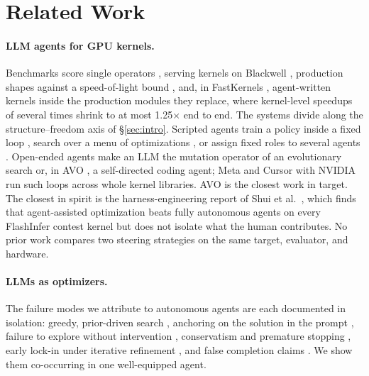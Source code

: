 \section{Related Work}
\label{sec:related}

\paragraph{LLM agents for GPU kernels.} Benchmarks score single operators
\cite{ouyang2025kernelbench,zhang2026kernelbenchverified}, serving kernels on Blackwell
\cite{xing2026flashinferbench,cao2026ksearch}, production shapes against a speed-of-light bound
\cite{lin2026solexecbench}, and, in FastKernels \cite{oliaro2026fastkernels}, agent-written kernels
inside the production modules they replace, where kernel-level speedups of several times shrink to
at most 1.25$\times$ end to end. The systems divide along the structure--freedom axis of
\S\ref{sec:intro}. Scripted agents train a policy inside a fixed loop
\cite{baronio2025kevin,li2025cudal1,drkernel2026,zhu2026qimengkernel,cudaagent2026}, search over a
menu of optimizations \cite{hong2025autocomp,kernelpro2026}, or assign fixed roles to several agents
\cite{wei2025astra,kernelskill2026,han2026kda,luo2026houmao,sun2026kernelclaw}. Open-ended agents
make an LLM the mutation operator of an evolutionary search
\cite{romeraparedes2024funsearch,novikov2025alphaevolve,lange2025shinkaevolve,guo2025evoengineer,wiedemann2026kernelfoundry,yuksekgonul2026tttdiscover,lange2025aicudaengineer,cuco2026}
or, in AVO \cite{chen2026avo}, a self-directed coding agent; Meta \cite{liao2025kernelevolve} and
Cursor with NVIDIA \cite{cursor2026multiagent} run such loops across whole kernel libraries. AVO is
the closest work in target. The closest in spirit is the harness-engineering report of Shui et al.\
\cite{shui2026harness}, which finds that agent-assisted optimization beats fully autonomous agents on
every FlashInfer contest kernel but does not isolate what the human contributes. No prior work
compares two steering strategies on the same target, evaluator, and hardware.

\paragraph{LLMs as optimizers.} The failure modes we attribute to autonomous agents are each
documented in isolation: greedy, prior-driven search
\cite{redko2026priorknowledge,dong2025stark,li2025tritonforge}, anchoring on the solution in the
prompt \cite{jones2022cognitivebiases}, failure to explore without intervention
\cite{krishnamurthy2024explore}, conservatism and premature stopping \cite{merouani2025compilot},
early lock-in under iterative refinement \cite{javaji2025turnwise}, and false completion claims
\cite{advani2026falsesuccess}. We show them co-occurring in one well-equipped agent.

